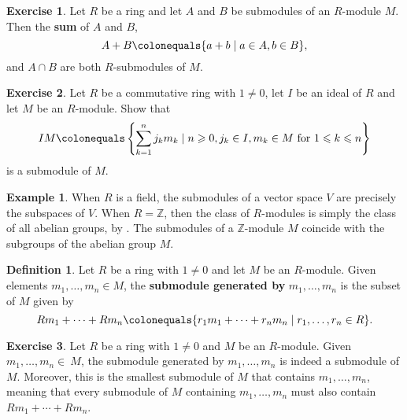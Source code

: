 \documentclass[12pt]{report}
\numberwithin{equation}{section}
\numberwithin{theorem}{chapter}
\theoremstyle{definition}
\newtheorem{definition}[theorem]{Definition}
\newtheorem{example}[theorem]{Example}
\newtheorem{exercise}{Exercise}
\newtheorem*{basic properties}{Basic Properties}
\newtheorem*{Important Remark}{Important Remark}
\newcommand{\df}[1]{{\bf #1}\index{#1}}
\begin{document}
\begin{exercise}\label{sum and intersection of submods}
	Let $R$ be a ring and let $A$ and $B$ be submodules of an $R$-module $M$. Then the {\bf sum} of $A$ and $B$,
	$$A + B \colonequals \{ a + b \mid a \in A, b \in B \},$$
	and $A \cap B$ are both $R$-submodules of $M$.
\end{exercise}

\begin{exercise}
Let $R$ be a commutative ring with $1\neq 0$, let $I$ be an ideal of $R$ and let $M$ be an $R$-module. Show that
$$IM \colonequals \left\{\sum_{k=1}^n j_km_k \mid n \geqslant 0, j_k \in I, m_k \in M \text{ for } 1 \leqslant k \leqslant n \right\}$$
is a submodule of $M$.
\end{exercise}


\begin{example}
When $R$ is a field, the submodules of a vector space $V$ are precisely the subspaces of $V$.
When $R = \mathbb{Z}$, then the class of $R$-modules is simply the class of all abelian groups, by . The submodules of a $\mathbb{Z}$-module $M$ coincide with the subgroups of the abelian group $M$. 
\end{example}




\begin{definition}
	Let $R$ be a ring with $1 \neq 0$ and let $M$ be an $R$-module. Given elements $m_1, \ldots, m_n \in M$, the \df{submodule generated by} $m_1, \ldots, m_n$ is the subset of $M$ given by
	$$Rm_1 + \cdots + Rm_n \colonequals \{ r_1 m_1 + \cdots + r_n m_n \mid r_1, \ldots, r_n \in R\}.$$
\end{definition}

\begin{exercise}
Let $R$ be a ring with $1 \neq 0$ and $M$ be an $R$-module. Given $m_1, \ldots, m_n \in~M$, the submodule generated by $m_1, \ldots, m_n$ is indeed a submodule of $M$. Moreover, this is the smallest submodule of $M$ that contains $m_1, \ldots, m_n$, meaning that every submodule of $M$ containing $m_1, \ldots, m_n$ must also contain $R m_1 + \cdots + R m_n$.
\end{exercise}


\end{document}
